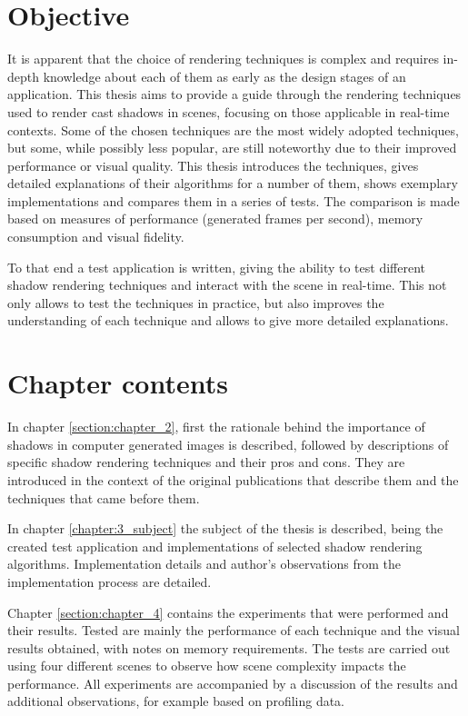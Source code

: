 \section{Objective}

It is apparent that the choice of rendering techniques is complex and requires in-depth knowledge about each of them as early as the design stages of an application. This thesis aims to provide a guide through the rendering techniques used to render cast shadows in scenes, focusing on those applicable in real-time contexts. Some of the chosen techniques are the most widely adopted techniques, but some, while possibly less popular, are  still noteworthy due to their improved performance or visual quality. This thesis introduces the techniques, gives detailed explanations of their algorithms for a number of them, shows exemplary implementations and compares them in a series of tests. The comparison is made based on measures of performance (generated frames per second), memory consumption and visual fidelity.

To that end a test application is written, giving the ability to test different shadow rendering techniques and interact with the scene in real-time. This not only allows to test the techniques in practice, but also improves the understanding of each technique and allows to give more detailed explanations.

\section{Chapter contents}
In chapter \ref{section:chapter_2}, first the rationale behind the importance of shadows in computer generated images is described, followed by descriptions of specific shadow rendering techniques and their pros and cons. They are introduced in the context of the original publications that describe them and the techniques that came before them.

In chapter \ref{chapter:3_subject} the subject of the thesis is described, being the created test application and implementations of selected shadow rendering algorithms. Implementation details and author's observations from the implementation process are detailed.

Chapter \ref{section:chapter_4} contains the experiments that were performed and their results. Tested are mainly the performance of each technique and the visual results obtained, with notes on memory requirements. The tests are carried out using four different scenes to observe how scene complexity impacts the performance. All experiments are accompanied by a discussion of the results and additional observations, for example based on profiling data.

